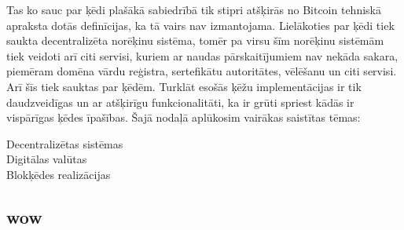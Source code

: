 Tas ko sauc par ķēdi plašākā sabiedrībā tik stipri atšķirās no Bitcoin tehniskā apraksta\cite{nakamoto08} dotās definīcijas, ka tā vairs nav izmantojama. 
Lielākoties par ķēdi tiek saukta decentralizēta norēķinu sistēma, tomēr pa virsu šīm norēķinu sistēmām tiek veidoti arī citi servisi, kuriem ar naudas pārskaitījumiem nav nekāda sakara, piemēram domēna vārdu reģistra, sertefikātu autoritātes, vēlēšanu un citi servisi.\cite{namecoin} Arī šīs tiek sauktas par ķēdēm.
Turklāt esošās ķēžu implementācijas ir tik daudzveidīgas un ar atšķirīgu funkcionalitāti, ka ir grūti spriest kādās ir vispārīgas ķēdes īpašības.
Šajā nodaļā aplūkosim vairākas saistītas tēmas:
\begin{description}
    \item[Decentralizētas sistēmas]
        \item[Digitālas valūtas]
        \item[Blokķēdes realizācijas]
\end{description}
\subsection{wow}




